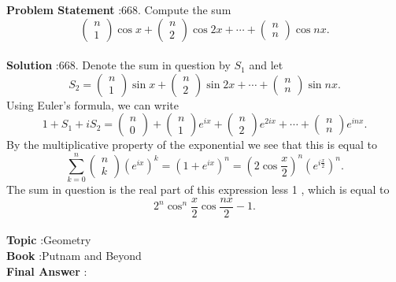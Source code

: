 \documentclass[10pt]{article}
\begin{document}
\textbf{Problem Statement} :668. Compute the sum$$ \left(\begin{array}{l} n \\ 1 \end{array}\right) \cos x+\left(\begin{array}{l} n \\ 2 \end{array}\right) \cos 2 x+\cdots+\left(\begin{array}{l} n \\ n \end{array}\right) \cos n x . $$\\
\textbf{Solution} :668. Denote the sum in question by $S_{1}$ and let$$ S_{2}=\left(\begin{array}{l} n \\ 1 \end{array}\right) \sin x+\left(\begin{array}{l} n \\ 2 \end{array}\right) \sin 2 x+\cdots+\left(\begin{array}{l} n \\ n \end{array}\right) \sin n x . $$Using Euler's formula, we can write$$ 1+S_{1}+i S_{2}=\left(\begin{array}{l} n \\ 0 \end{array}\right)+\left(\begin{array}{l} n \\ 1 \end{array}\right) e^{i x}+\left(\begin{array}{l} n \\ 2 \end{array}\right) e^{2 i x}+\cdots+\left(\begin{array}{l} n \\ n \end{array}\right) e^{i n x} . $$By the multiplicative property of the exponential we see that this is equal to$$ \sum_{k=0}^{n}\left(\begin{array}{l} n \\ k \end{array}\right)\left(e^{i x}\right)^{k}=\left(1+e^{i x}\right)^{n}=\left(2 \cos \frac{x}{2}\right)^{n}\left(e^{i \frac{x}{2}}\right)^{n} . $$The sum in question is the real part of this expression less 1 , which is equal to$$ 2^{n} \cos ^{n} \frac{x}{2} \cos \frac{n x}{2}-1 . $$\\
\textbf{Topic} :Geometry\\
\textbf{Book} :Putnam and Beyond\\
\textbf{Final Answer} :\\
\end{document}
